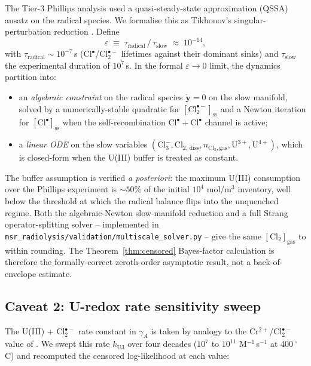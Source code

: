 \documentclass[11pt]{article}
\theoremstyle{definition}
\theoremstyle{remark}
\newcommand{\Clt}{\mathrm{Cl}_2^{\bullet-}\xspace}
\newcommand{\Cltdiss}{\mathrm{Cl}_{2,\,\mathrm{diss}}\xspace}
\begin{document}
The Tier-3 Phillips analysis used a quasi-steady-state approximation (QSSA) ansatz on
the radical species. We formalise this as Tikhonov's singular-perturbation reduction
\citep{Khalil2002}. Define
\[
  \varepsilon \;\equiv\; \tau_{\text{radical}} \,/\, \tau_{\text{slow}} \;\approx\; 10^{-14},
\]
with $\tau_{\text{radical}} \sim 10^{-7}\,$s (Cl$^{\bullet}$/Cl$_2^{\bullet-}$ lifetimes against
their dominant sinks) and $\tau_{\text{slow}}$ the experimental duration of $10^7\,$s. In the
formal $\varepsilon \to 0$ limit, the dynamics partition into:
\begin{itemize}
  \item an \emph{algebraic constraint} on the radical species $\dot{\mathbf{y}} = 0$ on the
        slow manifold, solved by a numerically-stable quadratic for $[\Clt]_{\text{ss}}$
        and a Newton iteration for $[\mathrm{Cl}^\bullet]_{\text{ss}}$ when the
        self-recombination $\mathrm{Cl}^\bullet + \mathrm{Cl}^\bullet$ channel is active;
  \item a \emph{linear ODE} on the slow variables $(\mathrm{Cl}_3^-, \Cltdiss,
        n_{\mathrm{Cl}_2,\text{gas}}, \mathrm{U}^{3+}, \mathrm{U}^{4+})$, which is
        closed-form when the U(III) buffer is treated as constant.
\end{itemize}
The buffer assumption is verified \emph{a posteriori}: the maximum U(III) consumption
over the Phillips experiment is $\sim 50\%$ of the initial $10^4$ mol/m$^3$ inventory,
well below the threshold at which the radical balance flips into the unquenched
regime. Both the algebraic-Newton slow-manifold reduction and a full Strang
operator-splitting solver \citep{Strang1968} -- implemented in
\texttt{msr\_radiolysis/validation/multiscale\_solver.py} -- give the same
$[\mathrm{Cl}_2]_{\text{gas}}$ to within rounding. The Theorem~\ref{thm:censored}
Bayes-factor calculation is therefore the formally-correct zeroth-order asymptotic
result, not a back-of-envelope estimate.

\subsection{Caveat 2: U-redox rate sensitivity sweep}\label{sec:caveat2}

The U(III) + Cl$_2^{\bullet-}$ rate constant in $\gamma_A$ is taken by analogy to the
Cr$^{2+}$/Cl$_2^{\bullet-}$ value of \citet{Iwamatsu2026}. We swept this rate
$k_{\mathrm{U3}}$ over four decades ($10^7$ to $10^{11}$ M$^{-1}\,$s$^{-1}$ at 400\,$^\circ$C)
and recomputed the censored log-likelihood at each value:
\end{document}
